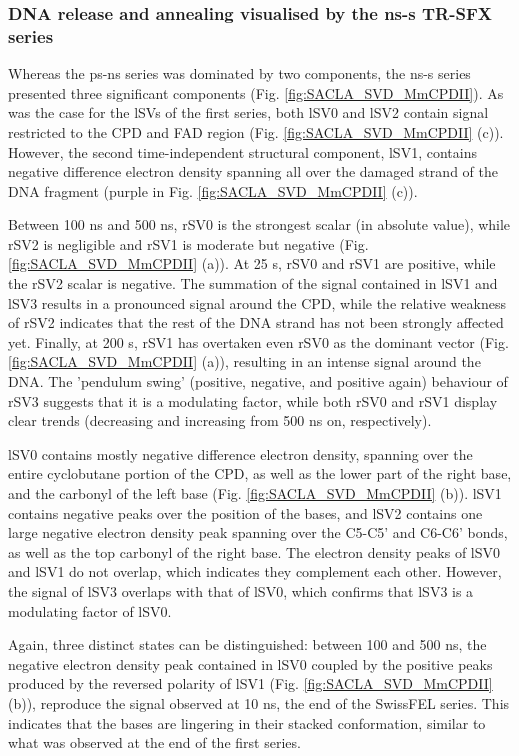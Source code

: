 \subsubsection{DNA release and annealing visualised by the ns-\textmu s TR-SFX series}

Whereas the ps-ns series was dominated by two components, the ns-\textmu s series presented three significant components (Fig. \ref{fig:SACLA_SVD_MmCPDII}). As was the case for the lSVs of the first series, both lSV0 and lSV2 contain signal restricted to the CPD and FAD region (Fig. \ref{fig:SACLA_SVD_MmCPDII} (c)). However, the second time-independent structural component, lSV1, contains negative difference electron density spanning all over the damaged strand of the DNA fragment (purple in Fig. \ref{fig:SACLA_SVD_MmCPDII} (c)). 

Between 100 ns and  500 ns, rSV0 is the strongest scalar (in absolute value), while rSV2 is negligible and rSV1 is moderate but negative (Fig. \ref{fig:SACLA_SVD_MmCPDII} (a)). At 25 \textmu s, rSV0 and  rSV1 are positive, while the rSV2 scalar is negative. The summation of the signal contained in lSV1 and lSV3 results in a pronounced signal around the CPD, while the relative weakness of rSV2 indicates that the rest of the DNA strand has not been strongly affected yet. Finally, at 200 \textmu s, rSV1 has overtaken even rSV0 as the dominant vector (Fig. \ref{fig:SACLA_SVD_MmCPDII} (a)), resulting in an intense signal around the DNA. The 'pendulum swing' (positive, negative, and positive again) behaviour of rSV3 suggests that it is a modulating factor, while both rSV0 and rSV1 display clear trends (decreasing and increasing from 500 ns on, respectively).

lSV0 contains mostly negative difference electron density, spanning over the entire cyclobutane portion of the CPD, as well as the lower part of the right base, and the carbonyl of the left base (Fig. \ref{fig:SACLA_SVD_MmCPDII} (b)). lSV1 contains negative peaks over the position of the bases, and lSV2 contains one large negative electron density peak spanning over the C5-C5' and C6-C6' bonds, as well as the top carbonyl of the right base. The electron density peaks of lSV0 and lSV1 do not overlap, which indicates they complement each other. However, the signal of lSV3 overlaps with that of lSV0, which confirms that lSV3 is a modulating factor of lSV0.

Again, three distinct states can be distinguished: between 100 and 500 ns, the negative electron density peak contained in lSV0 coupled by the positive peaks produced by the reversed polarity of lSV1 (Fig. \ref{fig:SACLA_SVD_MmCPDII} (b)), reproduce the signal observed at 10 ns, the end of the SwissFEL series. This indicates that the bases are lingering in their stacked conformation, similar to what was observed at the end of the first series. 

